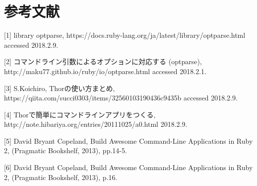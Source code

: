 \chapter*{参考文献}\label{ux53c2ux8003ux6587ux732e}

{[}1{]} library optparse,
https://docs.ruby-lang.org/ja/latest/library/optparse.html accessed
2018.2.9.

{[}2{]} コマンドライン引数によるオプションに対応する (optparse),
http://maku77.github.io/ruby/io/optparse.html accessed 2018.2.1.

{[}3{]} S.Koichiro, Thorの使い方まとめ,
https://qiita.com/succi0303/items/32560103190436c9435b accessed
2018.2.9.

{[}4{]} Thorで簡単にコマンドラインアプリをつくる,
http://note.hibariya.org/entries/20111025/a0.html 2018.2.9.

{[}5{]} David Bryant Copeland, Build Awesome Command-Line Applications
in Ruby 2, (Pragmatic Bookshelf, 2013), pp.14-5.

{[}6{]} David Bryant Copeland, Build Awesome Command-Line Applications
in Ruby 2, (Pragmatic Bookshelf, 2013), p.16.


    

